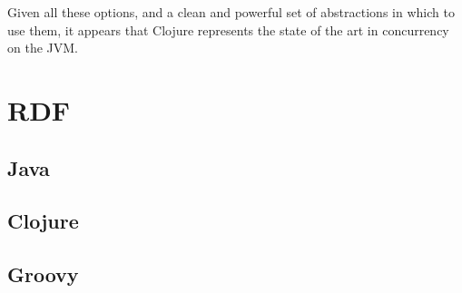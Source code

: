 \documentclass[a4paper,12pt]{kth-mag}
\begin{document}
Given all these options, and a clean and powerful set of abstractions in which to use them, it appears that Clojure represents the state of the art in concurrency on the JVM.

\appendix
\addappheadtotoc
\chapter{RDF}\label{appA}

\section{Java}

\section{Clojure}

\section{Groovy}




\end{document}
